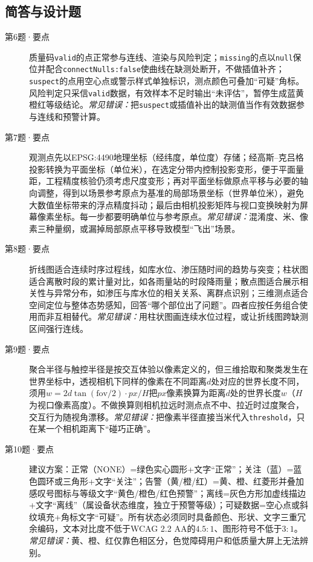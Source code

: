 \subsection*{简答与设计题}
\begin{description}
  \item[第6题·要点] 质量码\texttt{valid}的点正常参与连线、渲染与风险判定；\texttt{missing}的点以\texttt{null}保位并配合\texttt{connectNulls:false}使曲线在缺测处断开，不做插值补齐；\texttt{suspect}的点用空心点或警示样式单独标识，测点颜色可叠加“可疑”角标。风险判定只采信\texttt{valid}数据，有效样本不足时输出“未评估”，暂停生成蓝黄橙红等级结论。\textit{常见错误：}把\texttt{suspect}或插值补出的缺测值当作有效数据参与连线和预警计算。
  \item[第7题·要点] 观测点先以EPSG:4490地理坐标（经纬度，单位度）存储；经高斯--克吕格投影转换为平面坐标（单位米），在选定分带内控制投影变形，便于平面量距，工程精度核验仍须考虑尺度变形；再对平面坐标做原点平移与必要的轴向调整，得到以场景参考原点为基准的局部场景坐标（世界单位米），避免大数值坐标带来的浮点精度抖动；最后由相机投影矩阵与视口变换映射为屏幕像素坐标。每一步都要明确单位与参考原点。\textit{常见错误：}混淆度、米、像素三种量纲，或漏掉局部原点平移导致模型“飞出”场景。
  \item[第8题·要点] 折线图适合连续时序过程线，如库水位、渗压随时间的趋势与突变；柱状图适合离散时段的累计量对比，如各雨量站的时段降雨量；散点图适合展示相关性与异常分布，如渗压与库水位的相关关系、离群点识别；三维测点适合空间定位与整体态势感知，回答“哪个部位出了问题”。四者应按任务组合使用而非互相替代。\textit{常见错误：}用柱状图画连续水位过程，或让折线图跨缺测区间强行连线。
  \item[第9题·要点] 聚合半径与触控半径是按交互体验以像素定义的，但三维拾取和聚类发生在世界坐标中，透视相机下同样的像素在不同距离$d$处对应的世界长度不同，须用$w=2d\tan(\mathrm{fov}/2)\cdot px/H$把$px$像素换算为距离$d$处的世界长度$w$（$H$为视口像素高度）。不做换算则相机拉远时测点点不中、拉近时过度聚合，交互行为随视角漂移。\textit{常见错误：}把像素半径直接当米代入\texttt{threshold}，只在某一个相机距离下“碰巧正确”。
  \item[第10题·要点] 建议方案：正常（NONE）=绿色实心圆形+文字“正常”；关注（蓝）=蓝色圆环或三角形+文字“关注”；告警（黄/橙/红）=黄、橙、红菱形并叠加感叹号图标与等级文字“黄色/橙色/红色预警”；离线=灰色方形加虚线描边+文字“离线”（属设备状态维度，独立于预警等级）；可疑数据=空心点或斜纹填充+角标文字“可疑”。所有状态必须同时具备颜色、形状、文字三重冗余编码，文本对比度不低于WCAG 2.2 AA的$4.5{:}1$、图形符号不低于$3{:}1$。\textit{常见错误：}黄、橙、红仅靠色相区分，色觉障碍用户和低质量大屏上无法辨别。
\end{description}

